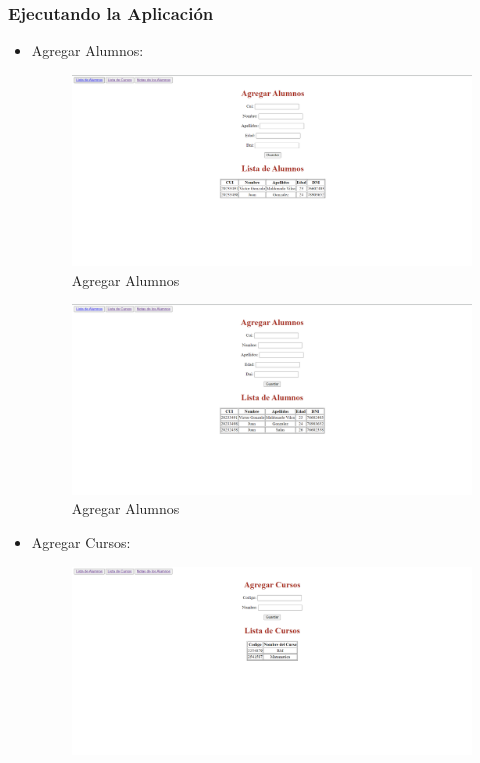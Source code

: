 \documentclass{article}
\begin{document}
  \subsubsection{Ejecutando la Aplicación}
  \begin{itemize}
    \item Agregar Alumnos:
    \begin{figure}[H]
      \centering
      \includegraphics[width=1\textwidth, keepaspectratio]{img/html1.png}
      \caption{Agregar Alumnos}
    \end{figure}
    \begin{figure}[H]
      \centering
      \includegraphics[width=1\textwidth, keepaspectratio]{img/html2.png}
      \caption{Agregar Alumnos}
    \end{figure}
    \newpage
    \item Agregar Cursos:
    \begin{figure}[H]
      \centering
      \includegraphics[width=1\textwidth, keepaspectratio]{img/html3.png}

\end{figure}
\end{itemize}
\end{document}

